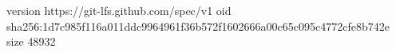 version https://git-lfs.github.com/spec/v1
oid sha256:1d7c985f116a011ddc9964961f36b572f1602666a00c65c095c4772cfe8b742e
size 48932
